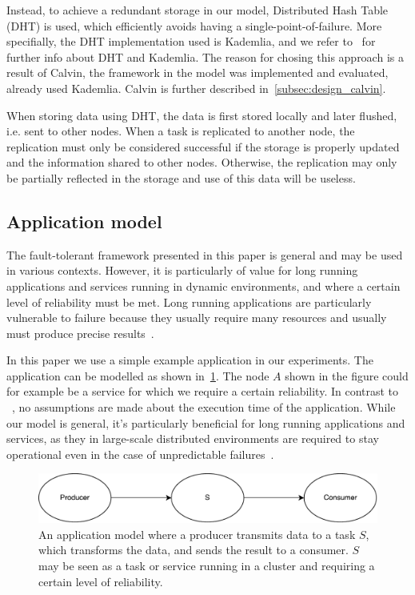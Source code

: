 \documentclass{cslthse-msc}
\begin{document}
Instead, to achieve a redundant storage in our model, Distributed Hash Table (DHT) is used, which efficiently avoids having a single-point-of-failure. More specifially, the DHT implementation used is Kademlia, and we refer to~\cite{kademlia} for further info about DHT and Kademlia. The reason for chosing this approach is a result of Calvin, the framework in the model was implemented and evaluated, already used Kademlia. Calvin is further described in~\cref{subsec:design_calvin}.

When storing data using DHT, the data is first stored locally and later flushed, i.e. sent to other nodes. When a task is replicated to another node, the replication must only be considered successful if the storage is properly updated and the information shared to other nodes. Otherwise, the replication may only be partially reflected in the storage and use of this data will be useless. 

\subsection{Application model} \label{subsec:design_app_model}
The fault-tolerant framework presented in this paper is general and may be used in various contexts. However, it is particularly of value for long running applications and services running in dynamic environments, and where a certain level of reliability must be met. Long running applications are particularly vulnerable to failure because they usually require many resources and usually must produce precise results~\cite{relGridSystems}.

In this paper we use a simple example application in our experiments. The application can be modelled as shown in~\cref{fig:app_model}. The node $A$ shown in the figure could for example be a service for which we require a certain reliability. In contrast to ~\cite{algoOptTimeMaxRel, optTaskAllocationForMaxRel, taskAllocation, taskAllocationSwarm, algoMaxRelEndToEndConstraint, algoMinExTime, schedReplicas}, no assumptions are made about the execution time of the application. While our model is general, it's particularly beneficial for long running applications and services, as they in large-scale distributed environments are required to stay operational even in the case of unpredictable failures~\cite{imprRelAdaptRL}.

\begin{figure}[!hbt]
\centering
\includegraphics[scale=0.5]{images/app_model.pdf} 
\caption{An application model where a producer transmits data to a task $S$, which transforms the data, and sends the result to a consumer. $S$ may be seen as a task or service running in a cluster and requiring a certain level of reliability.}\label{fig:app_model}
\end{figure}
\end{document}

